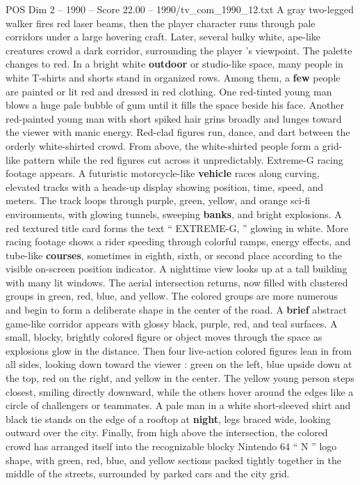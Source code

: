 \begin{textsample}{POS Dim 2 – 1990 – Score 22.00 – 1990/tv\_com\_1990\_12.txt}
A gray two-legged walker fires red laser beams, then the player character runs through pale corridors under a large hovering craft.
Later, several bulky white, ape-like creatures crowd a dark corridor, surrounding the player ’s viewpoint.
The palette changes to red.
In a bright white \textbf{outdoor} or studio-like space, many people in white T-shirts and shorts stand in organized rows.
Among them, a \textbf{few} people are painted or lit red and dressed in red clothing.
One red-tinted young man blows a huge pale bubble of gum until it fills the space beside his face.
Another red-painted young man with short spiked hair grins broadly and lunges toward the viewer with manic energy.
Red-clad figures run, dance, and dart between the orderly white-shirted crowd.
From above, the white-shirted people form a grid-like pattern while the red figures cut across it unpredictably.
Extreme-G racing footage appears.
A futuristic motorcycle-like \textbf{vehicle} races along curving, elevated tracks with a heads-up display showing position, time, speed, and meters.
The track loops through purple, green, yellow, and orange sci-fi environments, with glowing tunnels, sweeping \textbf{banks}, and bright explosions.
A red textured title card forms the text “ EXTREME-G, ” glowing in white.
More racing footage shows a rider speeding through colorful ramps, energy effects, and tube-like \textbf{courses}, sometimes in eighth, sixth, or second place according to the visible on-screen position indicator.
A nighttime view looks up at a tall building with many lit windows.
The aerial intersection returns, now filled with clustered groups in green, red, blue, and yellow.
The colored groups are more numerous and begin to form a deliberate shape in the center of the road.
A \textbf{brief} abstract game-like corridor appears with glossy black, purple, red, and teal surfaces.
A small, blocky, brightly colored figure or object moves through the space as explosions glow in the distance.
Then four live-action colored figures lean in from all sides, looking down toward the viewer : green on the left, blue upside down at the top, red on the right, and yellow in the center.
The yellow young person steps closest, smiling directly downward, while the others hover around the edges like a circle of challengers or teammates.
A pale man in a white short-sleeved shirt and black tie stands on the edge of a rooftop at \textbf{night}, legs braced wide, looking outward over the city.
Finally, from high above the intersection, the colored crowd has arranged itself into the recognizable blocky Nintendo 64 “ N ” logo shape, with green, red, blue, and yellow sections packed tightly together in the middle of the streets, surrounded by parked cars and the city grid.

\end{textsample}
